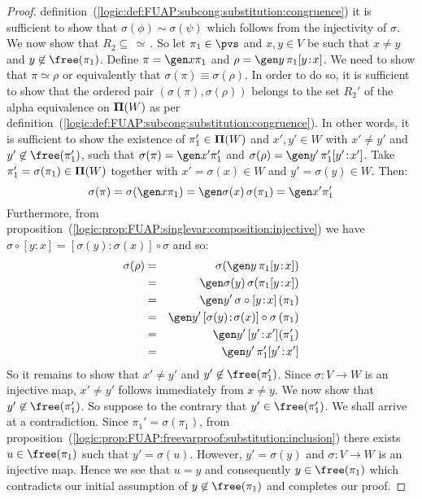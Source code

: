 \begin{proof}
definition~(\ref{logic:def:FUAP:subcong:substitution:congruence}) it
is sufficient to show that $\sigma(\phi)\sim\sigma(\psi)$ which
follows from the injectivity of $\sigma$. We now show that
$R_{2}\subseteq\,\simeq$\,. So let $\pi_{1}\in\pvs$ and $x,y\in V$
be such that $x\neq y$ and $y\not\in\free(\pi_{1})$. Define
$\pi=\gen x\pi_{1}$ and $\rho=\gen y\,\pi_{1}[y\!:\!x]$. We need to
show that $\pi\simeq\rho$ or equivalently that
$\sigma(\pi)\equiv\sigma(\rho)$. In order to do so, it is sufficient
to show that the ordered pair $(\sigma(\pi),\sigma(\rho))$ belongs
to the set $R_{2}'$ of the alpha equivalence on ${\bf\Pi}(W)$
as per
definition~(\ref{logic:def:FUAP:subcong:substitution:congruence}).
In other words, it is sufficient to show the existence of
$\pi_{1}'\in{\bf\Pi}(W)$ and $x',y'\in W$ with $x'\neq y'$ and
$y'\not\in\free(\pi_{1}')$, such that $\sigma(\pi)=\gen x'\pi_{1}'$
and $\sigma(\rho)=\gen y'\,\pi_{1}'[y'\!:\!x']$. Take
$\pi_{1}'=\sigma(\pi_{1})\in{\bf\Pi}(W)$ together with
$x'=\sigma(x)\in W$ and $y'=\sigma(y)\in W$. Then:
    \[
    \sigma(\pi)=\sigma(\gen x\pi_{1})\\
        =\gen\sigma(x)\,\sigma(\pi_{1})\\
        =\gen x'\pi_{1}'
    \]
Furthermore, from
proposition~(\ref{logic:prop:FUAP:singlevar:composition:injective})
we have $\sigma\circ[y\!:\!x]=[\sigma(y)\!:\!\sigma(x)]\circ\sigma$
and so:
    \begin{eqnarray*}
    \sigma(\rho)&=&\sigma(\gen y\,\pi_{1}[y\!:\!x])\\
    &=&\gen\sigma(y)\,\sigma(\pi_{1}[y\!:\!x])\\
    &=&\gen y'\,\sigma\circ [y\!:\!x]\,(\pi_{1})\\
    &=&\gen y'\, [\sigma(y)\!:\!\sigma(x)]\circ\sigma\,(\pi_{1})\\
    &=&\gen y'\,[y'\!:\!x'](\pi_{1}')\\
    &=&\gen y'\,\pi_{1}'[y'\!:\!x']
    \end{eqnarray*}
So it remains to show that $x'\neq y'$ and
$y'\not\in\free(\pi_{1}')$. Since $\sigma:V\to W$ is an injective
map, $x'\neq y'$ follows immediately from $x\neq y$. We now show
that $y'\not\in\free(\pi_{1}')$. So suppose to the contrary that
$y'\in\free(\pi_{1}')$. We shall arrive at a contradiction. Since
$\pi_{1}'=\sigma(\pi_{1})$, from
proposition~(\ref{logic:prop:FUAP:freevarproof:substitution:inclusion})
there exists $u\in\free(\pi_{1})$ such that $y'=\sigma(u)$. However,
$y'=\sigma(y)$ and $\sigma:V\to W$ is an injective map. Hence we see
that $u=y$ and consequently $y\in\free(\pi_{1})$ which contradicts
our initial assumption of $y\not\in\free(\pi_{1})$ and completes our
proof.
\end{proof}


